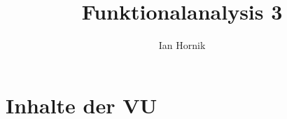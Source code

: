 \documentclass[a4paper, 11pt]{../../defs/lecture-notes}
\title{Funktionalanalysis 3}
\author{Ian Hornik}
\begin{document}
\maketitle

\tableofcontents
















\chapter{Inhalte der VU}






\end{document}
